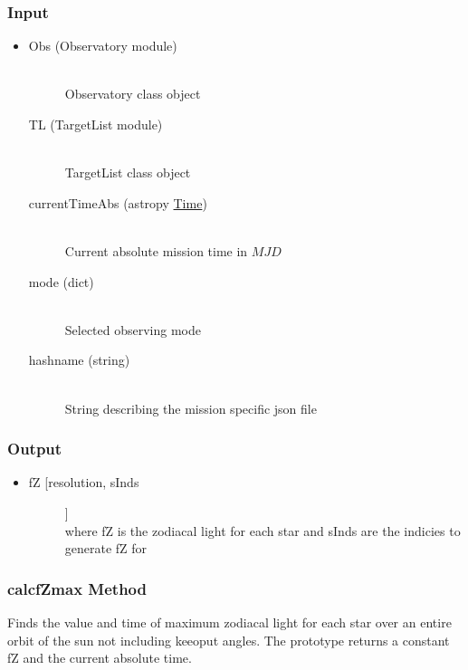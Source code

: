 \documentclass[cleanfoot]{asme2ej}
\begin{document}
\subsubsection*{Input}
\begin{itemize}
\item
\begin{description}
    \item[Obs (Observatory module)] \hfill \\ Observatory class object
    \item[TL (TargetList module)] \hfill \\ TargetList class object
    \item[currentTimeAbs (astropy \href{http://astropy.readthedocs.org/en/latest/time/index.html}{Time})] \hfill \\ Current absolute mission time in $ MJD $
    \item[mode (dict)] \hfill \\ Selected observing mode
    \item[hashname (string)] \hfill \\ String describing the mission specific json file
\end{description}
\end{itemize}
\subsubsection*{Output}
\begin{itemize}
\item
\begin{description}
    \item[fZ [resolution, sInds]] \hfill \\ where fZ is the zodiacal light for each star and sInds are the indicies to generate fZ for
\end{description}
\end{itemize}

\subsubsection{calcfZmax Method} \label{sec:calcfZmaxtask}
Finds the value and time of maximum zodiacal light for each star over an entire orbit of the sun not including keeoput angles. The prototype returns a constant fZ and the current absolute time.
\end{document}
